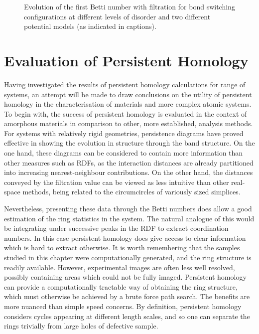 \begin{figure}[tb]
	\caption{Evolution of the first Betti number with filtration for bond switching configurations at different levels of disorder and two different potential models (as indicated in captions).}
	\label{fig:bsbetti}
\end{figure}

\section{Evaluation of Persistent Homology}

Having investigated the results of persistent homology calculations for range of \td{} systems, an attempt will be made to draw conclusions on the utility of persistent homology in the characterisation of \td{} materials and more complex atomic systems.
To begin with, the success of persistent homology is evaluated in the context of \td{} amorphous materials in comparison to other, more established, analysis methods.
For systems with relatively rigid geometries, persistence diagrams have proved effective in showing the evolution in structure through the band structure.
On the one hand, these diagrams can be considered to contain more information than other measures such as RDFs, as the interaction distances are already partitioned into increasing nearest\--neighbour contributions.
On the other hand, the distances conveyed by the filtration value can be viewed as less intuitive than other real\--space methods, being related to the circumcircles of variously sized simplices.

Nevertheless, presenting these data through the Betti numbers does allow a good estimation of the ring statistics in the system.
The natural analogue of this would be integrating under successive peaks in the RDF to extract coordination numbers.
In this case persistent homology does give access to clear information which is hard to extract otherwise.
It is worth remembering that the samples studied in this chapter were computationally generated, and the ring structure is readily available.
However, experimental images are often less well resolved, possibly containing areas which could not be fully imaged.
Persistent homology can provide a computationally tractable way of obtaining the ring structure, which must otherwise be achieved by a brute force path search.
The benefits are more nuanced than simple speed concerns.
By definition, persistent homology considers cycles appearing at different length scales, and so one can separate the rings trivially from large holes of defective sample.

